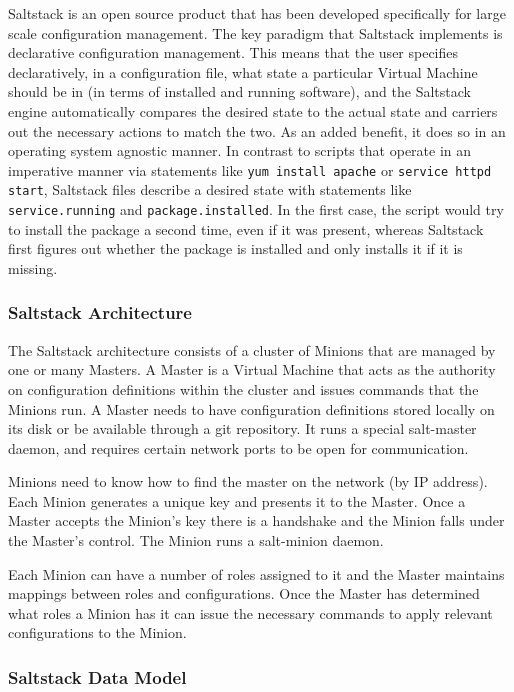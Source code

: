 Saltstack is an open source product that has been developed specifically for large scale configuration management. The key paradigm that Saltstack implements is declarative configuration management. This means that the user specifies declaratively, in a configuration file, what state a particular Virtual Machine should be in (in terms of installed and running software), and the Saltstack engine automatically compares the desired state to the actual state and carriers out the necessary actions to match the two. As an added benefit, it does so in an operating system agnostic manner. In contrast to scripts that operate in an imperative manner via statements like \texttt{yum install apache} or \texttt{service httpd start}, Saltstack files describe a desired state with statements like \texttt{service.running} and \texttt{package.installed}. In the first case, the script would try to install the package a second time, even if it was present, whereas Saltstack first figures out whether the package is installed and only installs it if it is missing.

\subsubsection {Saltstack Architecture}

The Saltstack architecture consists of a cluster of Minions that are managed by one or many Masters. A Master is a Virtual Machine that acts as the authority on configuration definitions within the cluster and issues commands that the Minions run. A Master needs to have configuration definitions stored locally on its disk or be available through a git repository. It runs a special salt-master daemon, and requires certain network ports to be open for communication.

Minions need to know how to find the master on the network (by IP address). Each Minion generates a unique key and presents it to the Master. Once a Master accepts the Minion's key there is a handshake and the Minion falls under the Master's control. The Minion runs a salt-minion daemon.

Each Minion can have a number of roles assigned to it and the Master maintains mappings between roles and configurations. Once the Master has determined what roles a Minion has it can issue the necessary commands to apply relevant configurations to the Minion. 

\subsubsection {Saltstack Data Model}

